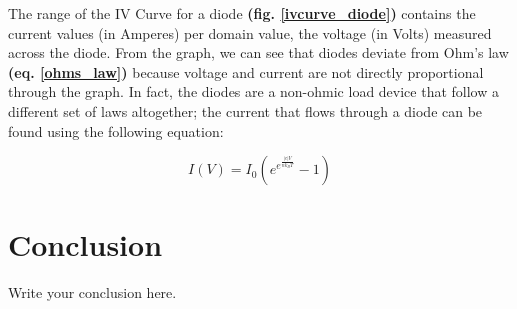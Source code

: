 \documentclass{article}
\begin{document}
The range of the IV Curve for a diode \textbf{(fig. \ref{ivcurve_diode})}
contains the current values (in Amperes) per domain value, the voltage (in
Volts) measured across the diode. From the graph, we can see that diodes deviate
from Ohm's law \textbf{(eq. \ref{ohms_law})} because voltage and current are not
directly proportional through the graph. In fact, the diodes are a non-ohmic
load device that follow a different set of laws altogether; the current that
flows through a diode can be found using the following equation:

\begin{equation}
    \label{iv_diode}
    I(V) = I_{0}(e^{e^{\frac{|e|V}{nk_{B}T}}}-1)
\end{equation}

\section{Conclusion}
Write your conclusion here.
\end{document}

